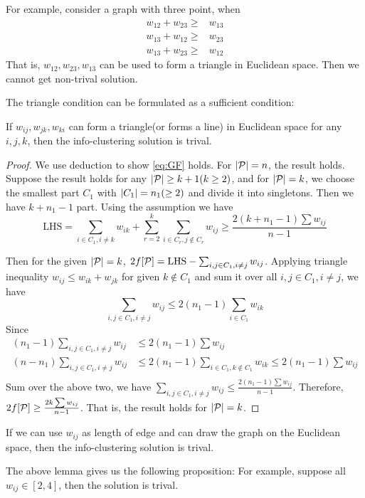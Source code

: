 \documentclass{article}
\begin{document}
For example, consider a graph with three point, when 
\begin{align*}
w_{12}+w_{23}\geq & w_{13} \\
w_{13}+w_{12}\geq & w_{23} \\
w_{13}+w_{23}\geq & w_{12} 
\end{align*}
That is, $w_{12}, w_{23}, w_{13}$ can be used to form a triangle in Euclidean space. Then we cannot get non-trival solution.

The triangle condition can be formulated as a sufficient condition:
\begin{lemma}
If $w_{ij}, w_{jk}, w_{ki}$ can form a triangle(or forms a line) in Euclidean space for any $i, j, k$, then the info-clustering solution is trival.
\end{lemma}
\begin{proof}
We use deduction to show  \eqref{eq:GF} holds. For $\abs{\P}=n$, the result holds. Suppose the result holds for any $\abs{\P} \geq k+1(k\geq 2)$, and for $\abs{\P}=k$, we choose the smallest part $C_1$ with $\abs{C_1}=n_1(\geq 2)$ and divide it into singletons. Then we have $k+n_1-1$ part. Using the assumption we have
$$
\mathrm{LHS} = \sum_{i\in C_1, i\neq k} w_{ik} + \sum_{r=2}^k \sum_{i \in C_r, j \not\in C_r} w_{ij}\geq \frac{2(k+n_1 -1)\sum w_{ij}}{n-1}
$$

Then for the given $\abs{\P}=k$, $2f[\P] =\mathrm{LHS} - \sum_{i,j\in C_1, i\neq j} w_{ij}$.
Applying triangle inequality $w_{ij} \leq w_{ik} + w_{jk}$ for given $k\not\in C_1$ and sum it over all $i, j \in C_1, i\neq j$, we have
$$
\sum_{i,j \in C_1, i\neq j} w_{ij} \leq 2(n_1-1)\sum_{i\in C_1} w_{ik}
$$
Since
\begin{align*}
(n_1 - 1) \sum_{i,j \in C_1, i\neq j} w_{ij}& \leq 2(n_1 - 1) \sum w_{ij} \\
(n - n_1) \sum_{i,j \in C_1, i\neq j} w_{ij}& \leq 2(n_1 - 1) \sum_{i \in C_1, k \not\in C_1} w_{ik} 
\leq 2(n_1 - 1) \sum w_{ij} \\
\end{align*}
Sum over the above two, we have $\sum_{i,j \in C_1, i\neq j} w_{ij} \leq \frac{2(n_1-1) \sum w_{ij}}{n-1}$. Therefore, 
$2f[\P] \geq \frac{2k \sum w_{ij}}{n-1}$. That is, the result holds for $\abs{\P}=k$.
\end{proof}
If we can use $w_{ij}$ as length of edge and can draw the graph on the Euclidean space, then the info-clustering solution is trival.

The above lemma gives us the following proposition:
For example, suppose all $w_{ij} \in [2,4]$, then the solution is trival.
\end{document}
